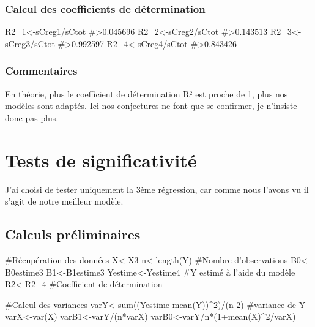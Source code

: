 \hypertarget{calcul-des-coefficients-de-duxe9termination}{%
\subsubsection{Calcul des coefficients de
détermination}\label{calcul-des-coefficients-de-duxe9termination}}

\begin{Schunk}
\begin{Sinput}
R2_1<-sCreg1/sCtot
#>0.045696
R2_2<-sCreg2/sCtot
#>0.143513
R2_3<-sCreg3/sCtot
#>0.992597
R2_4<-sCreg4/sCtot
#>0.843426
\end{Sinput}
\end{Schunk}

\hypertarget{commentaires-1}{%
\subsubsection{Commentaires}\label{commentaires-1}}

En théorie, plus le coefficient de détermination R² est proche de 1,
plus nos modèles sont adaptés. Ici nos conjectures ne font que se
confirmer, je n'insiste donc pas plus.

\hypertarget{tests-de-significativituxe9}{%
\section{Tests de significativité}\label{tests-de-significativituxe9}}

J'ai choisi de tester uniquement la 3ème régression, car comme nous
l'avons vu il s'agit de notre meilleur modèle.

\hypertarget{calculs-pruxe9liminaires}{%
\subsection{Calculs préliminaires}\label{calculs-pruxe9liminaires}}

\begin{Schunk}
\begin{Sinput}
#Récupération des données
X<-X3
n<-length(Y) #Nombre d'observations
B0<-B0estime3
B1<-B1estime3
Yestime<-Yestime4 #Y estimé à l'aide du modèle
R2<-R2_4 #Coefficient de détermination


#Calcul des variances
varY<-sum((Yestime-mean(Y))^2)/(n-2) #variance de Y
varX<-var(X)
varB1<-varY/(n*varX)
varB0<-varY/n*(1+mean(X)^2/varX)
\end{Sinput}
\end{Schunk}

